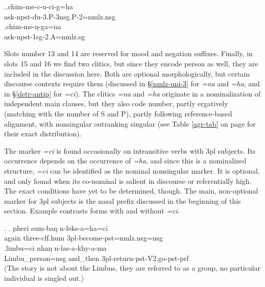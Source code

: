 \ex.\ag.chim-me-c-u-ci-g=ha\\
	ask{\sc -npst-du-3.P-3nsg.P-2=nmlz.nsg}\\
	\bg.chim-me-ŋ-ga=na\\
	ask{\sc -npst-1sg-2.A=nmlz.sg}\\
	
	
Slots number 13 and 14 are reserved for mood and negation suffixes. Finally, in slots 15 and 16 we find two clitics, but since they encode person as well, they are included in the discussion here. Both are optional morphologically, but certain discourse contexts require them (discussed in §\ref{nmlz-uni-3} for \emph{=na} and \emph{=ha}, and in §\ref{detr-antip} for \emph{=ci}). The clitics \emph{=na} and \emph{=ha} originate in a nominalization of independent main clauses, but they also code number, partly ergatively (matching with the number of S and P), partly following reference-based alignment, with nonsingular outranking singular (see Table \ref{agr-tab} on page \pageref{agr-tab} for their exact distribution).

The marker \emph{=ci} is found occasionally on intransitive verbs with {\sc 3pl} subjects. Its occurrence depends on the occurrence of \emph{=ha}, and since this is a nominalized structure, \emph{=ci} can be identified as the nominal nonsingular marker.  It is optional, and only found when its co-nominal is salient in discourse or referentially high. The exact conditions have yet to be determined, though. The main, non-optional marker for {\sc 3pl} subjects is the nasal prefix discussed in the beginning of this section. Example \Next contrasts forms with and without \emph{=ci}. 

\ex. \ag.           pheri sum-baŋ       n-leks-a=ha=ci\\
again three{\sc -clf.hum} {\sc 3pl-}become{\sc -pst=nmlz.nsg=nsg}\\
 
\bg.limbu=ci nhaŋ n-las-a-khy-a-ma\\
Limbu\_person{\sc =nsg} and\_then {\sc 3pl-}return{\sc -pst-V2.go-pst-prf}\\
 (The story is not about the Limbus, they are referred to as  a group, no particular individual is singled out.) 


